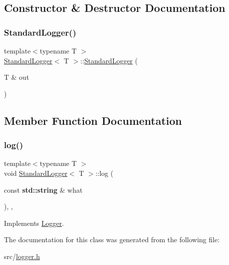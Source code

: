 \subsection{Constructor \& Destructor Documentation}
\mbox{\label{class_standard_logger_a2c81129e394334f40058d0fc38d427ab}} 
\subsubsection{\texorpdfstring{Standard\+Logger()}{StandardLogger()}}
{\footnotesize\ttfamily template$<$typename T $>$ \\
\hyperlink{class_standard_logger}{Standard\+Logger}$<$ T $>$\+::\hyperlink{class_standard_logger}{Standard\+Logger} (\begin{DoxyParamCaption}\item[{T \&}]{out }\end{DoxyParamCaption})\hspace{0.3cm}{\ttfamily [inline]}}



\subsection{Member Function Documentation}
\mbox{\label{class_standard_logger_af09ac6658b0c4826d1b3bd3292736184}} 
\subsubsection{\texorpdfstring{log()}{log()}}
{\footnotesize\ttfamily template$<$typename T $>$ \\
void \hyperlink{class_standard_logger}{Standard\+Logger}$<$ T $>$\+::log (\begin{DoxyParamCaption}\item[{const \textbf{ std\+::string} \&}]{what }\end{DoxyParamCaption})\hspace{0.3cm}{\ttfamily [inline]}, {\ttfamily [override]}, {\ttfamily [virtual]}}



Implements \hyperlink{class_logger_a20f6e95efb1eab08269484d8745feb65}{Logger}.



The documentation for this class was generated from the following file\+:\begin{DoxyCompactItemize}
\item 
src/\hyperlink{logger_8h}{logger.\+h}\end{DoxyCompactItemize}
